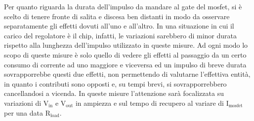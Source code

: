 Per quanto riguarda la durata dell'impulso da mandare al gate del mosfet, si è scelto di tenere fronte di salita e discesa ben distanti in modo da osservare separatamente gli effetti dovuti all'uno e all'altro.
In una situazione in cui il carico del regolatore è il chip, infatti, le variazioni sarebbero di minor durata rispetto alla lunghezza dell'impulso utilizzato in queste misure.
Ad ogni modo lo scopo di queste misure è solo quello di vedere gli effetti al passaggio da un certo consumo di corrente ad uno maggiore e viceversa ed un impulso di breve durata sovrapporrebbe questi due effetti, non permettendo di valutarne l'effettiva entità, in quanto i contributi sono opposti e, su tempi brevi, si sovrapporrebbero cancellandosi a vicenda.
In queste misure l'attenzione sarà focalizzata su variazioni di $\mathrm{V_{in}}$ e $\mathrm{V_{out}}$ in ampiezza e sul tempo di recupero al variare di $\mathrm{I_{mosfet}}$ per una data $\mathrm{R_{load}}$.

